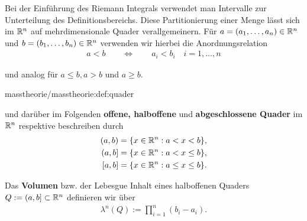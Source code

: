 \par
Bei der Einführung des Riemann Integrals verwendet man Intervalle zur Unterteilung des Definitionsbereichs.
Diese Partitionierung einer Menge lässt sich im \(\mathbb{R}^n\) auf mehrdimensionale Quader verallgemeinern. Für \(a = (a_1,\ldots,a_n) \in \mathbb{R}^n\) und \(b = (b_1,\ldots,b_n) \in \mathbb{R}^n\) verwenden wir hierbei die Anordnungsrelation
\begin{align*}
a < b \qquad \Leftrightarrow \qquad a_i < b_i \quad i=1,\ldots,n
\end{align*}
\par
und analog für \(a \leq b, a > b\) und \(a \geq b\).
\begin{definition}{}{masstheorie/masstheorie:def:quader}



\par
und darüber im Folgenden \textbf{offene, halboffene} und \textbf{abgeschlossene Quader} im \(\mathbb{R}^n\) respektive beschreiben durch
\begin{align*}
(a,b) &= \lbrace x \in \mathbb{R}^n : a < x < b \rbrace,\\
(a,b] &= \lbrace x \in \mathbb{R}^n : a < x \leq b \rbrace,\\
[a,b] &= \lbrace x \in \mathbb{R}^n : a \leq x \leq b \rbrace.
\end{align*}
\par
Das \textbf{Volumen} bzw. der Lebesgue Inhalt eines halboffenen Quaders \(Q := (a,b] \subset \mathbb{R}^n\) definieren wir über
\begin{align*}
\lambda^n(Q) := \prod_{i=1}^n (b_i - a_i).
\end{align*}\end{definition}

